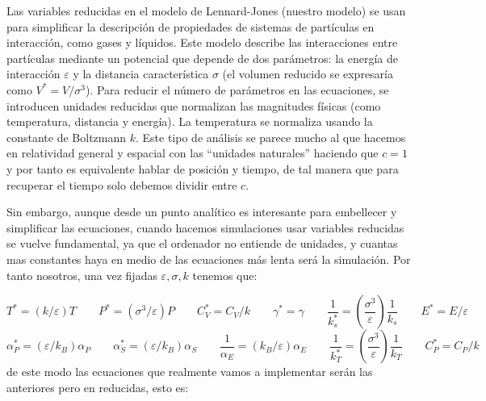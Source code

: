 \documentclass[11pt]{article} %
\newcommand{\parentesis}[1]{\left( #1  \right)}
\newcommand{\dquad}{\quad \quad}
\begin{document}
Las variables reducidas en el modelo de Lennard-Jones (nuestro modelo) se usan para simplificar la descripción de propiedades de sistemas de partículas en interacción, como gases y líquidos. Este modelo describe las interacciones entre partículas mediante un potencial que depende de dos parámetros: la energía de interacción $\varepsilon$ y la distancia característica $\sigma$ (el volumen reducido se expresaría como $V^*=V/\sigma^3$). Para reducir el número de parámetros en las ecuaciones, se introducen unidades reducidas que normalizan las magnitudes físicas (como temperatura, distancia y energía). La temperatura se normaliza usando la constante de Boltzmann $k$. Este tipo de análisis se parece mucho al que hacemos en relatividad general y espacial con las ``unidades naturales'' haciendo que $c=1$ y por tanto es equivalente hablar de posición y tiempo, de tal manera que para recuperar el tiempo solo debemos dividir entre $c$. 


Sin embargo, aunque desde un punto analítico es interesante para embellecer y simplificar las ecuaciones, cuando hacemos simulaciones usar variables reducidas se vuelve fundamental, ya que el ordenador no entiende de unidades, y cuantas mas constantes haya en medio de las ecuaciones más lenta será la simulación. Por tanto nosotros, una vez fijadas $\varepsilon,\sigma,k$ tenemos que:

\begin{equation*}
	T^* = (k/\varepsilon) T \dquad P^* =(\sigma^3 / \varepsilon)  P  \dquad C_V^* = C_V/k \dquad \gamma^* = \gamma \dquad \frac{1}{k_s^*} =\parentesis{\frac{\sigma^3}{\varepsilon}} \frac{1}{k_s}  \dquad E^*=E/\varepsilon
\end{equation*}
\begin{equation*}
	\alpha_P^* = (\varepsilon/k_B) \alpha_P \dquad
	\alpha_S^* = (\varepsilon/k_B) \alpha_S \dquad
	\frac{1}{\alpha_E} = (k_B/\varepsilon) \alpha_E \dquad
	\frac{1}{k_T^*} = \parentesis{\frac{\sigma^3}{\varepsilon}} \frac{1}{k_T} \dquad C_P^*=C_P/k
\end{equation*}
de este modo las ecuaciones que realmente vamos a implementar serán las anteriores pero en reducidas, esto es:
\end{document}
